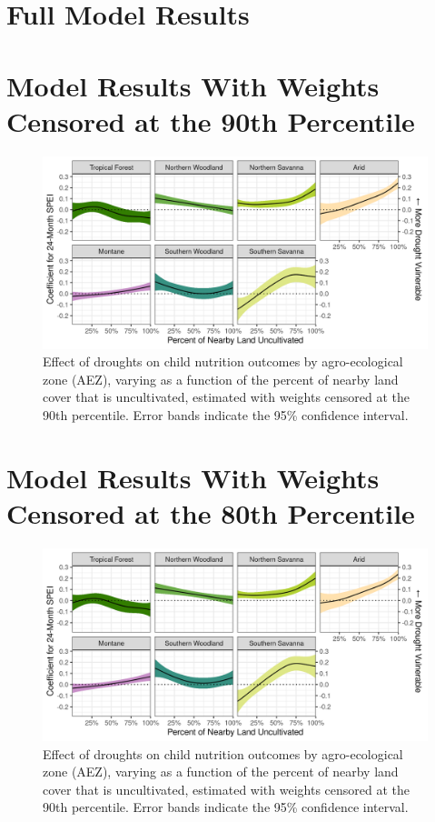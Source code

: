 \documentclass[titlepage]{article}
\begin{document}
\section{Full Model Results}


\newpage

\section{Model Results With Weights Censored at the 90th Percentile}
\begin{figure}[h!]
	\begin{center}
	\includegraphics[width=\linewidth]{AEZ_effects_q90.png}
	\end{center}
	\caption{Effect of droughts on child nutrition outcomes by agro-ecological zone (AEZ), varying as a function of the percent of nearby land cover that is uncultivated, estimated with weights censored at the 90th percentile.  Error bands indicate the 95\% confidence interval.}
\end{figure}



\newpage

\section{Model Results With Weights Censored at the 80th Percentile}
\begin{figure}[h!]
	\begin{center}
	\includegraphics[width=\linewidth]{AEZ_effects_q80.png}
	\end{center}
	\caption{Effect of droughts on child nutrition outcomes by agro-ecological zone (AEZ), varying as a function of the percent of nearby land cover that is uncultivated, estimated with weights censored at the 90th percentile.  Error bands indicate the 95\% confidence interval.}
\end{figure}
\end{document}
